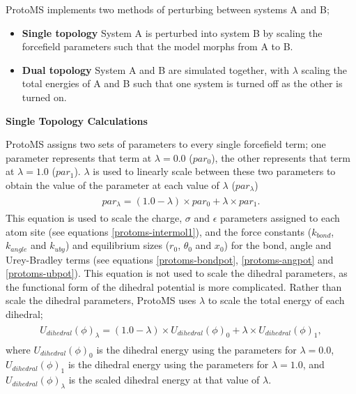 \documentclass[letterpaper,10pt,english]{sphinxmanual}
\begin{document}
ProtoMS implements two methods of perturbing between systems A and B;
\begin{itemize}
\item {} 
\textbf{Single topology} System A is perturbed into system B by scaling the forcefield parameters such that the model morphs from A to B.

\item {} 
\textbf{Dual topology} System A and B are simulated together, with \(\lambda\) scaling the total energies of A and B such that one system is turned off as the other is turned on.

\end{itemize}

\textbf{Single Topology Calculations}

ProtoMS assigns two sets of parameters to every single forcefield term; one parameter represents that term at \(\lambda=0.0\) (\(par_0\)), the other represents that term at \(\lambda=1.0\) (\(par_1\)). \(\lambda\) is used to linearly scale between these two parameters to obtain the value of the parameter at each value of \(\lambda\) (\(par_\lambda\))
\label{protoms:equation-lambdamix}\begin{gather}
\begin{split}par_\lambda = (1.0-\lambda) \times par_0 + \lambda \times par_1.\end{split}\label{protoms-lambdamix}
\end{gather}
This equation is used to scale the charge, \(\sigma\) and \(\epsilon\) parameters assigned to each atom site (see equations \eqref{protoms-intermol1}), and the force constants (\(k_{bond}\), \(k_{angle}\) and \(k_{uby}\)) and equilibrium sizes (\(r_0\), \(\theta_0\) and \(x_0\)) for the bond, angle and Urey-Bradley terms (see equations \eqref{protoms-bondpot}, \eqref{protoms-angpot} and \eqref{protoms-ubpot}). This equation is not used to scale the dihedral parameters, as the functional form of the dihedral potential is more complicated. Rather than scale the dihedral parameters, ProtoMS uses \(\lambda\) to scale the total energy of each dihedral;
\label{protoms:equation-dihmix}\begin{gather}
\begin{split}U_{dihedral}(\phi)_\lambda = (1.0-\lambda)\times U_{dihedral}(\phi)_0 + \lambda \times U_{dihedral}(\phi)_1,\end{split}\label{protoms-dihmix}
\end{gather}
where \(U_{dihedral}(\phi)_0\) is the dihedral energy using the parameters for \(\lambda=0.0\), \(U_{dihedral}(\phi)_1\) is the dihedral energy using the parameters for \(\lambda=1.0\), and \(U_{dihedral}(\phi)_\lambda\) is the scaled dihedral energy at that value of \(\lambda\).
\end{document}
